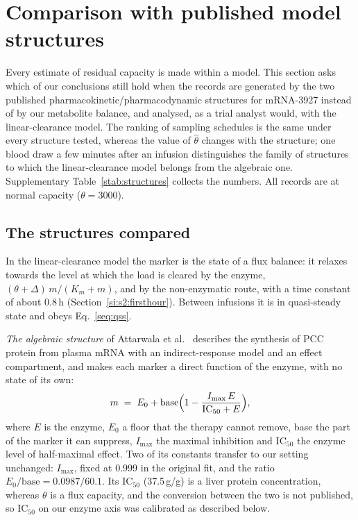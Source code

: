 \section{Comparison with published model structures}
\label{si:s3}

Every estimate of residual capacity is made within a model. This section asks which of our
conclusions still hold when the records are generated by the two published
pharmacokinetic\slash pharmacodynamic structures for mRNA-3927 instead of by our metabolite balance,
and analysed, as a trial analyst would, with the linear-clearance model. The ranking of sampling
schedules is the same under every structure tested, whereas the value of $\hat\theta$ changes
with the structure; one blood draw a few minutes after an infusion distinguishes the family of
structures to which the linear-clearance model belongs from the algebraic one. Supplementary
Table~\ref{stab:structures} collects the numbers. All records are at normal capacity
($\theta=3000$\um).

\subsection{The structures compared}
\label{si:s3:structures}

In the linear-clearance model the marker is the state of a flux balance: it relaxes towards the
level at which
the load is cleared by the enzyme, $(\theta+\Delta)\,m/(K_m+m)$, and by the non-enzymatic route,
with a time constant of about 0.8\,h (Section~\ref{si:s2:firsthour}). Between infusions it is in
quasi-steady state and obeys Eq.~\eqref{seq:qss}.

\emph{The algebraic structure} of Attarwala et al.~\cite{pkpd_translational} describes the
synthesis of PCC protein from plasma mRNA with an indirect-response model and an effect
compartment, and makes each marker a direct function of the enzyme, with no state of its own:
\begin{equation}
\label{seq:algebraic}
m \;=\; E_0+\mathrm{base}\Bigl(1-\frac{I_{\max}\,E}{\mathrm{IC}_{50}+E}\Bigr),
\end{equation}
where $E$ is the enzyme, $E_0$ a floor that the therapy cannot remove, base the part of the
marker it can suppress, $I_{\max}$ the maximal inhibition and $\mathrm{IC}_{50}$ the enzyme level
of half-maximal effect. Two of its constants transfer to our setting unchanged: $I_{\max}$, fixed
at 0.999 in the original fit, and the ratio $E_0/\mathrm{base}=0.0987/60.1$. Its
$\mathrm{IC}_{50}$ (37.5\,\textmu g/g) is a liver protein concentration, whereas $\theta$ is a flux
capacity, and the conversion between the two is not published, so $\mathrm{IC}_{50}$ on our
enzyme axis was calibrated as described below.

